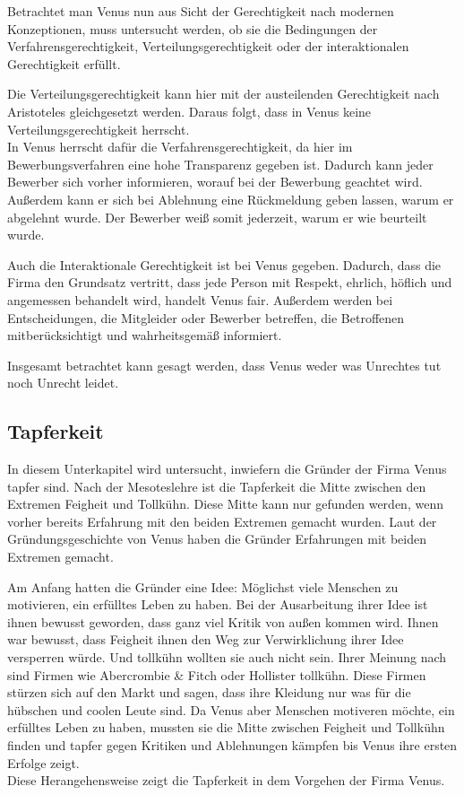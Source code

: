Betrachtet man Venus nun aus Sicht der Gerechtigkeit nach modernen Konzeptionen, muss untersucht werden, ob sie die Bedingungen der Verfahrensgerechtigkeit, Verteilungsgerechtigkeit oder der interaktionalen Gerechtigkeit erfüllt.

Die Verteilungsgerechtigkeit kann hier mit der austeilenden Gerechtigkeit nach Aristoteles gleichgesetzt werden. Daraus folgt, dass in Venus keine Verteilungsgerechtigkeit herrscht.\\
In Venus herrscht dafür die Verfahrensgerechtigkeit, da hier im Bewerbungsverfahren eine hohe Transparenz gegeben ist. Dadurch kann jeder Bewerber sich vorher informieren, worauf bei der Bewerbung geachtet wird. Außerdem kann er sich bei Ablehnung eine Rückmeldung geben lassen, warum er abgelehnt wurde. Der Bewerber weiß somit jederzeit, warum er wie beurteilt wurde.

Auch die Interaktionale Gerechtigkeit ist bei Venus gegeben. Dadurch, dass die Firma den Grundsatz vertritt, dass jede Person mit Respekt, ehrlich, höflich und angemessen behandelt wird, handelt Venus fair. Außerdem werden bei Entscheidungen, die Mitgleider oder Bewerber betreffen, die Betroffenen mitberücksichtigt und wahrheitsgemäß informiert.

Insgesamt betrachtet kann gesagt werden, dass Venus weder was Unrechtes tut noch Unrecht leidet.

\subsection{Tapferkeit}
In diesem Unterkapitel wird untersucht, inwiefern die Gründer der Firma Venus tapfer sind.
Nach der Mesoteslehre ist die Tapferkeit die Mitte zwischen den Extremen Feigheit und Tollkühn. Diese Mitte kann nur gefunden werden, wenn vorher bereits Erfahrung mit den beiden Extremen gemacht wurden. Laut der Gründungsgeschichte von Venus haben die Gründer Erfahrungen mit beiden Extremen gemacht.

Am Anfang hatten die Gründer eine Idee: Möglichst viele Menschen zu motivieren, ein erfülltes Leben zu haben. Bei der Ausarbeitung ihrer Idee ist ihnen bewusst geworden, dass ganz viel Kritik von außen kommen wird. Ihnen war bewusst, dass Feigheit ihnen den Weg zur Verwirklichung ihrer Idee versperren würde. Und tollkühn wollten sie auch nicht sein. Ihrer Meinung nach sind Firmen wie Abercrombie \& Fitch oder Hollister tollkühn. Diese Firmen stürzen sich auf den Markt und sagen, dass ihre Kleidung nur was für die hübschen und coolen Leute sind. Da Venus aber Menschen motiveren möchte, ein erfülltes Leben zu haben, mussten sie die Mitte zwischen Feigheit und Tollkühn finden und tapfer gegen Kritiken und Ablehnungen kämpfen bis Venus ihre ersten Erfolge zeigt.\\
Diese Herangehensweise zeigt die Tapferkeit in dem Vorgehen der Firma Venus.

